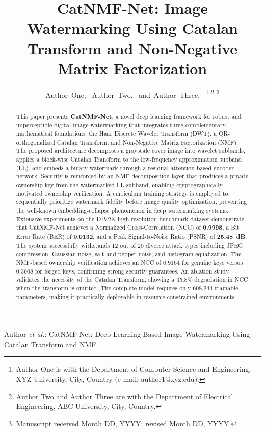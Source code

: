 \documentclass[journal]{IEEEtran}
\begin{document}
\title{CatNMF-Net: Image Watermarking Using Catalan Transform and Non-Negative Matrix Factorization}

\author{Author~One,~
        Author~Two,~
        and~Author~Three,~%
\thanks{Author One is with the Department of Computer Science and
Engineering, XYZ University, City, Country (e-mail: author1@xyz.edu).}%
\thanks{Author Two and Author Three are with the Department of
Electrical Engineering, ABC University, City, Country.}%
\thanks{Manuscript received Month DD, YYYY; revised Month DD, YYYY.}}

%
{Author \MakeLowercase{\textit{et al.}}: CatNMF-Net: Deep Learning Based
Image Watermarking Using Catalan Transform and NMF}

\maketitle

\begin{abstract}
This paper presents \textbf{CatNMF-Net}, a novel deep learning framework
for robust and imperceptible digital image watermarking that integrates
three complementary mathematical foundations: the Haar Discrete Wavelet
Transform (DWT), a QR-orthogonalized Catalan Transform, and Non-Negative
Matrix Factorization (NMF). The proposed architecture decomposes a
grayscale cover image into wavelet subbands, applies a block-wise Catalan
Transform to the low-frequency approximation subband (LL), and embeds a
binary watermark through a residual attention-based encoder network.
Security is reinforced by an NMF decomposition layer that produces a
private ownership key from the watermarked LL subband, enabling
cryptographically motivated ownership verification. A curriculum training
strategy is employed to sequentially prioritize watermark fidelity before
image quality optimization, preventing the well-known embedding-collapse
phenomenon in deep watermarking systems. Extensive experiments on the
DIV2K high-resolution benchmark dataset demonstrate that CatNMF-Net
achieves a Normalized Cross-Correlation (NCC) of \textbf{0.9998}, a Bit
Error Rate (BER) of \textbf{0.0132}, and a Peak Signal-to-Noise Ratio
(PSNR) of \textbf{25.48~dB}. The system successfully withstands 12 out
of 20 diverse attack types including JPEG compression, Gaussian noise,
salt-and-pepper noise, and histogram equalization. The NMF-based ownership
verification achieves an NCC of 0.9164 for genuine keys versus 0.3608
for forged keys, confirming strong security guarantees. An ablation study
validates the necessity of the Catalan Transform, showing a 35.8\%
degradation in NCC when the transform is omitted. The complete model
requires only 608,244 trainable parameters, making it practically
deployable in resource-constrained environments.
\end{abstract}
\end{document}
